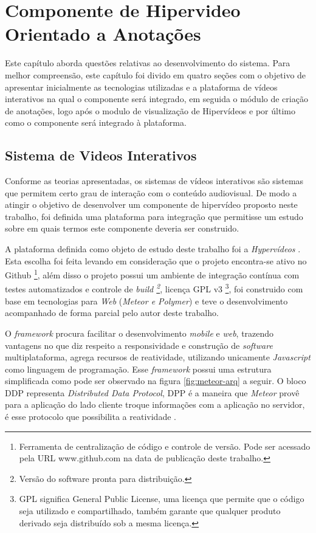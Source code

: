 \chapter[Componente de Hipervideo Orientado a Anotações]{Componente de Hipervideo Orientado a Anotações}

Este capítulo aborda questões relativas ao desenvolvimento do sistema. Para melhor compreensão, este capítulo foi divido em quatro seções com o objetivo de apresentar inicialmente as tecnologias utilizadas e a plataforma de vídeos interativos na qual o componente será integrado, em seguida o módulo de criação de anotações, logo após o modulo de visualização de Hipervídeos e por último como o componente será integrado à plataforma.

\section{Sistema de Videos Interativos}

Conforme as teorias apresentadas, os sistemas de vídeos interativos são sistemas que permitem certo grau de interação com o conteúdo audiovisual. De modo a atingir o objetivo de desenvolver um componente de hipervídeo proposto neste trabalho, foi definida uma plataforma para integração que permitisse um estudo sobre em quais termos este componente deveria ser construido.

A plataforma definida como objeto de estudo deste trabalho foi a \textit{Hypervídeos} \cite{arthurtcc}. Esta escolha foi feita levando em consideração que o projeto encontra-se ativo no Github \footnote{Ferramenta de centralização de código e controle de versão. Pode ser acessado pela URL www.github.com na data de publicação deste trabalho.}, além disso o projeto possui um ambiente de integração contínua com testes automatizados e controle de \textit{build \footnote{Versão do software pronta para distribuição.}}, licença GPL v3 \footnote{GPL significa General Public License, uma licença que permite que o código seja utilizado e compartilhado, também garante que qualquer produto derivado seja distribuído sob a mesma licença.}, foi construido com base em tecnologias para \textit{Web} (\textit{Meteor e Polymer}) e teve o desenvolvimento acompanhado de forma parcial pelo autor deste trabalho.

O \textit{framework} procura facilitar o desenvolvimento \textit{mobile} e \textit{web}, trazendo vantagens no que diz respeito a responsividade e construção de \textit{software} multiplataforma, agrega recursos de reatividade, utilizando unicamente \textit{Javascript} como linguagem de programação. Esse \textit{framework} possui uma estrutura simplificada como pode ser observado na figura \ref{fig:meteor-arq} a seguir. O bloco DDP representa \textit{Distributed Data Protocol}, DPP é a maneira que \textit{Meteor} provê para a aplicação do lado cliente troque informações com a aplicação no servidor, é esse protocolo que possibilita a reatividade \cite{meteor2015}.

